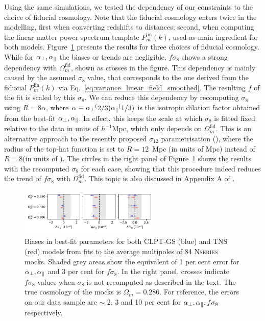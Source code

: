 Using the same simulations, we tested the dependency of our constraints to the choice of 
fiducial cosmology. Note that the fiducial cosmology enters twice in the modelling, first
when converting redshifts to distances; second, when computing the linear matter power spectrum 
template $P_m^\text{lin}(k)$, used as main ingredient for both models. 
Figure~\ref{fig:rsd_fid_cosmo} presents the results for three choices of fiducial cosmology. 
While for ${\alpha_\perp}, {\alpha_\parallel}$ the biases or trends are negligible, $f\sigma_8$ shows 
a strong dependency with $\Omega_m^\text{fid}$, shown as crosses in the figure. 
This dependency is mainly caused by the assumed $\sigma_8$ value, that corresponds to the 
one derived from the fiducial $P_m^\text{lin}(k)$ via Eq.~\ref{eq:variance_linear_field_smoothed}.
The resulting $f$ of the fit is scaled by this $\sigma_8$. 
We can reduce this dependency by recomputing $\sigma_8$ using $R=8\alpha$\hmpc,
where $\alpha \equiv {\alpha_\perp}^(2/3){\alpha_\parallel}^(1/3)$ is the isotropic dilation factor obtained from the best-fit ${\alpha_\perp},{\alpha_\parallel}$.
In effect, this keeps the scale at which $\sigma_8$ is fitted fixed relative 
to the data in units of $h^{-1}$Mpc, which only depends on $\Omega_m^\text{fid}$. 
This is an alternative approach to the recently proposed $\sigma_{12}$ parametrisation 
(\cite{sanchezArgumentsUsingMpc2020}), where the radius of the top-hat function is set to 
$R=12$~Mpc (in units of Mpc) instead of $R=8$\hmpc (in units of \hmpc). 
The circles in the right panel of Figure~\ref{fig:rsd_fid_cosmo} shows the results with 
the recomputed $\sigma_8$ for each case, showing that this procedure indeed reduces the 
trend of $f\sigma_8$ with $\Omega_m^\text{fid}$. 
This topic is also discussed in Appendix A of \cite{alamCompletedSDSSIVExtended2021}. 

\begin{figure}
    \centering 
    \includegraphics[width=0.6\textwidth]{fig/galaxies/rsd_nseries_fidcosmo_updated.pdf}
    \caption{Biases in best-fit parameters for both CLPT-GS (blue) and TNS (red) 
    models from fits to the average multipoles of 84 \textsc{Nseries} mocks.
    Shaded grey areas show the equivalent of 1 per cent error for ${\alpha_\perp},{\alpha_\parallel}$
    and 3 per cent for $f\sigma_8$. In the right panel, crosses indicate $f\sigma_8$ values
    when $\sigma_8$ is not recomputed as described in the text. 
    The true cosmology of the mocks is $\Omega_m = 0.286$. 
    For reference, the errors on our data sample are $\sim$ 2, 3 and 10 per cent for 
    ${\alpha_\perp}, {\alpha_\parallel}, f\sigma_8$ respectively. }
    \label{fig:rsd_fid_cosmo}
\end{figure}

